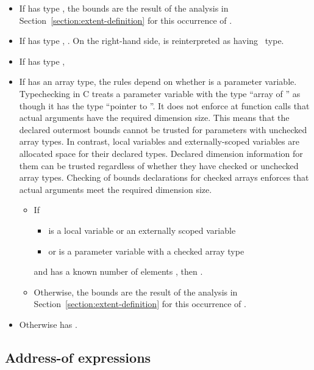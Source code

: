 \begin{itemize}
\item
  If  has type \arrayptr, the bounds are the result of
  the analysis in Section~\ref{section:extent-definition}
  for this occurrence of .
\item
  If  has type \ptrT, 
  .
   On the right-hand side,  is reinterpreted as having \arrayptr\ type.
\item
  If  has type
  \spanptrT, 
\item
  If  has an array type, the rules depend on whether   is a parameter
  variable.  Typechecking in C treats a parameter variable with the type ``array of ''
   as though it has the type ``pointer to ''.   It does not enforce 
  at function calls that actual arguments have the required dimension size.  This means
  that the declared outermost bounds cannot be trusted for parameters with unchecked
  array types.  In contrast, local variables and externally-scoped variables are allocated 
  space for their declared types.  Declared dimension information for them can be trusted 
  regardless of whether they have checked or unchecked array types.  Checking of bounds 
  declarations for checked arrays  enforces that actual arguments meet the required
  dimension size.
\begin{itemize}
\item If 
\begin{itemize} 
\item {} is a local variable or an externally scoped variable 
\item or  is a parameter variable with a checked array type
\end{itemize}
and  has a known number of elements , then  
  .
\item Otherwise, the bounds are the result of the analysis in 
  Section~\ref{section:extent-definition} for this occurrence of .
\end{itemize}
\item  Otherwise  has \boundsnone.
\end{itemize}

\subsection{Address-of expressions}

